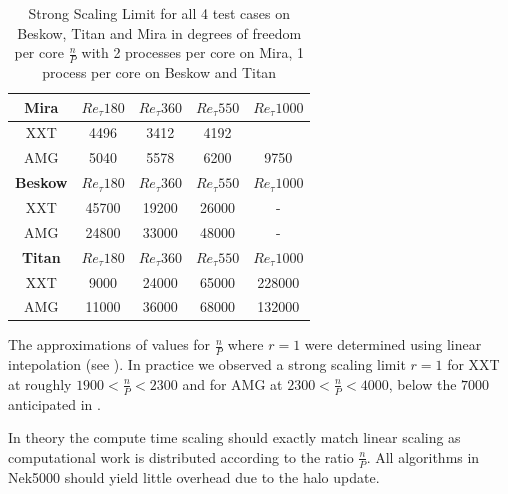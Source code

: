 \documentclass{sig-alternate}
\begin{document}
\begin{table}  
  \caption{Strong Scaling Limit for all 4 test cases on Beskow, Titan and Mira
  in degrees of freedom per core $\frac{n}{P}$ with 2 processes per core on Mira, 1 process per core on Beskow and Titan}
  \begin{tabular}{c||cccc}
    \hline
    \hline
    {\bf Mira}
    &$Re_{\tau} 180$&$Re_{\tau} 360$&$Re_{\tau} 550$&$Re_{\tau} 1000$\\
    \hline
    XXT&4496&3412&4192&\\
    AMG&5040&5578&6200&9750\\
    \hline
    \hline
    {\bf Beskow}
    &$Re_{\tau} 180$&$Re_{\tau} 360$&$Re_{\tau} 550$&$Re_{\tau} 1000$\\
    \hline
    XXT&45700&19200&26000& - \\
    AMG&24800&33000&48000& - \\
    \hline
    \hline
    {\bf Titan}
    &$Re_{\tau} 180$&$Re_{\tau} 360$&$Re_{\tau} 550$&$Re_{\tau} 1000$\\
    \hline
    XXT&9000&24000&65000&228000\\
    AMG&11000&36000&68000&132000\\
    \hline
    \hline
  \end{tabular}
  \label{tab:stronglimit}
\end{table}
The approximations of values for $\frac{n}{P}$ where
$r=1$ were determined using linear intepolation (see ).
 In practice we observed a strong scaling limit $r=1$ for XXT at roughly $1900<
\frac{n}{P} < 2300$ and for AMG at $2300<\frac{n}{P}<4000$, below the $7000$
anticipated in \cite{fischer:scaling}. 

In theory the compute time scaling should exactly match linear scaling
as computational work is distributed according to the ratio $\frac{n}{P}$. All
algorithms in Nek5000 should yield little overhead due to the halo update. 
\end{document}
